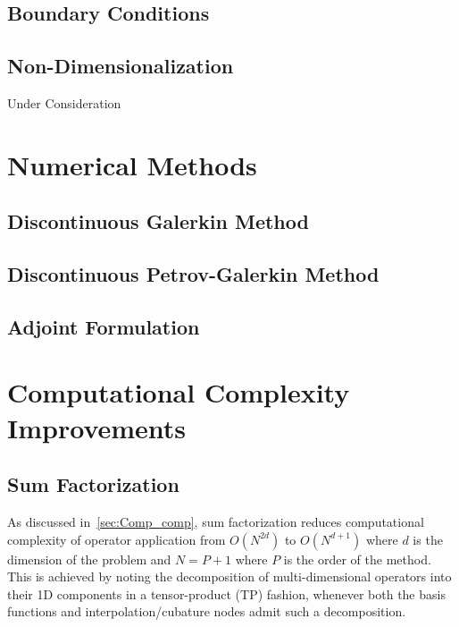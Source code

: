 \documentclass[12pt,Bold,letterpaper,TexShade]{mcgilletdclass}
\numberwithin{equation}{section}
\begin{document}
\section{Boundary Conditions}

\section{Non-Dimensionalization}
{\color{red}Under Consideration}



\chapter{Numerical Methods}

\section{Discontinuous Galerkin Method}

\section{Discontinuous Petrov-Galerkin Method}

\section{Adjoint Formulation}



\chapter{Computational Complexity Improvements}

\section{Sum Factorization}

As discussed in~\autoref{sec:Comp_comp}, sum factorization reduces computational complexity of operator application from $O(N^{2d})$ to $O(N^{d+1})$ where $d$ is the dimension of the problem and $N = P+1$ where $P$ is the order of the method. This is achieved by noting the decomposition of multi-dimensional operators into their 1D components in a tensor-product (TP) fashion, whenever both the basis functions and interpolation/cubature nodes admit such a decomposition. 
\end{document}
